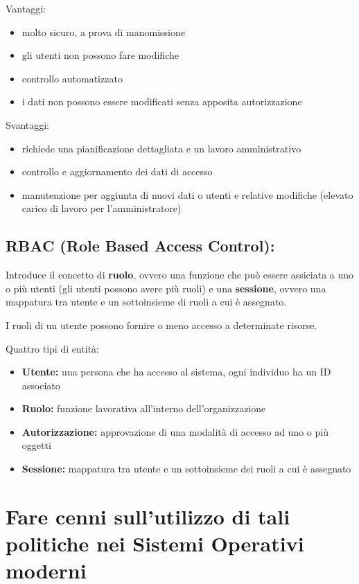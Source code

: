 \documentclass{report}
\begin{document}
\noindent Vantaggi:
\begin{itemize}
    \item molto sicuro, a prova di manomissione
    \item gli utenti non possono fare modifiche
    \item controllo automatizzato
    \item i dati non possono essere modificati senza apposita autorizzazione
\end{itemize}

\noindent Svantaggi:
\begin{itemize}
    \item richiede una pianificazione dettagliata e un lavoro amministrativo
    \item controllo e aggiornamento dei dati di accesso
    \item manutenzione per aggiunta di nuovi dati o utenti e relative modifiche (elevato carico di lavoro per l'amministratore)
\end{itemize}

\subsection{RBAC (Role Based Access Control):}
\noindent Introduce il concetto di \textbf{ruolo}, ovvero una funzione che può essere assiciata a uno o più utenti (gli utenti possono avere più ruoli)
e una \textbf{sessione}, ovvero una mappatura tra utente e un sottoinsieme di ruoli a cui è assegnato.

\noindent I ruoli di un utente possono fornire o meno accesso a determinate risorse.

\noindent Quattro tipi di entità:
\begin{itemize}
    \item \textbf{Utente:} una persona che ha accesso al sistema, ogni individuo ha un ID associato
    \item \textbf{Ruolo:} funzione lavorativa all'interno dell'organizzazione
    \item \textbf{Autorizzazione:} approvazione di una modalità di accesso ad uno o più oggetti
    \item \textbf{Sessione:} mappatura tra utente e un sottoinsieme dei ruoli a cui è assegnato
\end{itemize}

\section{Fare cenni sull'utilizzo di tali politiche nei Sistemi Operativi moderni}
\end{document}

